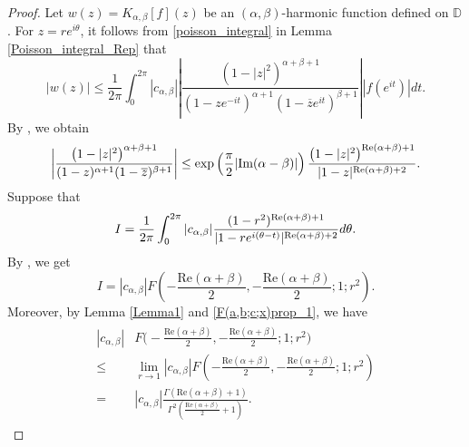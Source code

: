 \documentclass[11pt, reqno]{amsart}
\theoremstyle{definition}
\numberwithin{equation}{section}
\newcommand{\abs}[1]{\left\vert#1\right\vert}
\theoremstyle{remark}
\numberwithin{equation}{section}
\begin{document}
	\begin{proof}
		Let  $w(z)=K_{\alpha,\beta}[f](z)$ be an $(\alpha,\beta)$-harmonic function defined on  $\mathbb{D}$.
		For $z=re^{i\theta}$, it follows from \eqref{poisson_integral} in Lemma \ref{Poisson_integral_Rep} that
		\begin{equation}\label{Thm1eq1}
			|w(z)|\leq  \frac{1}{2\pi}\int_0^{2\pi}\abs{c_{\alpha,\beta}}\abs{\frac{\left(1 - |z|^2\right)^{\alpha + \beta + 1}}{(1 - ze^{-it})^{\alpha+1} (1 - \overline{z}e^{it})^{\beta+1}}}\abs{f\left(e^{it}\right)}dt .
		\end{equation}
		By \cite[Theorem 6.4]{KlintbergOlofsson}, we obtain  \begin{equation}\label{WVB_3.3}
        \bigg|\frac{\left(1 - |z|^2\right)^{\alpha + \beta + 1}}{(1 - z)^{\alpha+1} (1 - \overline{z})^{\beta+1}}\bigg|\leq \exp\left(\frac{\pi}{2}| \text{\rm Im}(\alpha-\beta)|\right)\frac{\left(1-|z|^2\right)^{\text{\rm Re}(\alpha+\beta)+1}}{|1-z|^{\text{\rm Re}(\alpha+\beta)+2}}.
        \end{equation}
		Suppose that $$I=\frac{1}{2\pi}\int_0^{2\pi}|c_{\alpha,\beta}|\frac{(1-r^2)^{\text{\rm Re}(\alpha+\beta)+1}}{|1-re^{i(\theta-t)}|^{\text{\rm Re}(\alpha+\beta)+2}} d\theta.$$
		By \cite[Theorem 2.1]{PLiSamyLuo}, we get
		$$I=|c_{\alpha,\beta}|F\left(-\frac{\mbox{Re}(\alpha+\beta)}{2},-\frac{\mbox{Re}(\alpha+\beta)}{2};1;r^2\right).$$  Moreover, by Lemma \ref{Lemma1} and \eqref{F(a,b;c;x)prop_1}, we have
		\begin{align*}
        \begin{split}
		|c_{\alpha,\beta}|&F\bigg(-\frac{\mbox{Re}(\alpha+\beta)}{2},-\frac{\mbox{Re}(\alpha+\beta)}{2};1;r^2\bigg)\\\leq&	\lim_{r \to 1}|c_{\alpha,\beta}|F\left(-\frac{\mbox{Re}(\alpha+\beta)}{2},-\frac{\mbox{Re}(\alpha+\beta)}{2};1;r^2\right)\\=&|c_{\alpha,\beta}|\frac{\Gamma\left(\mbox{Re}(\alpha+\beta)+1\right)}{\Gamma^2\left(\frac{\mbox{Re}(\alpha+\beta)}{2}+1\right)}.%
        \end{split}
		\end{align*}
		

\end{proof}
\end{document}
